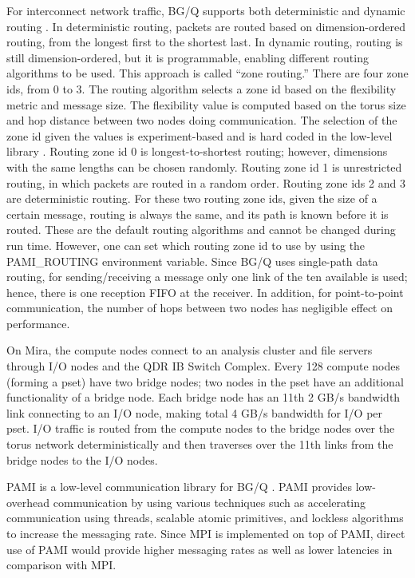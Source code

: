\documentclass[final,5p,times]{elsarticle}
\begin{document}
For interconnect network traffic, BG/Q supports both deterministic and dynamic routing \cite{Chen:BGQ}. In deterministic routing, packets are routed based on dimension-ordered routing, from the longest first to the shortest last. In dynamic routing, routing is still dimension-ordered, but it is programmable, enabling different routing algorithms to be used. This approach is called ``zone routing.'' There are four zone ids, from 0 to 3. The routing algorithm selects a zone id based on the flexibility metric and message size. The flexibility value is computed based on the torus size and hop distance between two nodes doing communication. The selection of the zone id given the values is experiment-based and is hard coded in the low-level library \cite{BGQRedbook:Gilge}.
Routing zone id 0 is longest-to-shortest routing; however, dimensions with the same lengths can be chosen randomly. 
Routing zone id 1 is unrestricted routing, in which packets are routed in a random order.
Routing zone ids 2 and 3 are deterministic routing. For these two routing zone ids, given the size of a certain message, routing is always the same, and its path is known before it is routed. These are the default routing algorithms and cannot be changed during run time. However, one can set which routing zone id to use by using the PAMI\_ROUTING environment variable. Since BG/Q uses single-path data routing, for sending/receiving a message only one link of the ten available is used; hence, there is one reception FIFO at the receiver. In addition, for point-to-point communication, the number of hops between two nodes has negligible effect on performance.

On Mira, the compute nodes connect to an analysis cluster and file servers through I/O nodes and the QDR IB Switch Complex. Every 128 compute nodes (forming a pset) have two bridge nodes; two nodes in the pset have an additional functionality of a bridge node. Each bridge node has an 11th 2 GB/s bandwidth link connecting to an I/O node, making total 4 GB/s bandwidth for I/O per pset. I/O traffic is routed from the compute nodes to the bridge nodes over the torus network deterministically and then traverses over the 11th links from the bridge nodes to the I/O nodes.

PAMI is a low-level communication library for BG/Q \cite{PAMI:Kumar}. PAMI provides low-overhead communication by using various techniques such as accelerating communication using threads, scalable atomic primitives, and lockless algorithms to increase the messaging rate. Since MPI is implemented on top of PAMI, direct use of PAMI would provide higher messaging rates as well as lower latencies in comparison with MPI.
\end{document}
